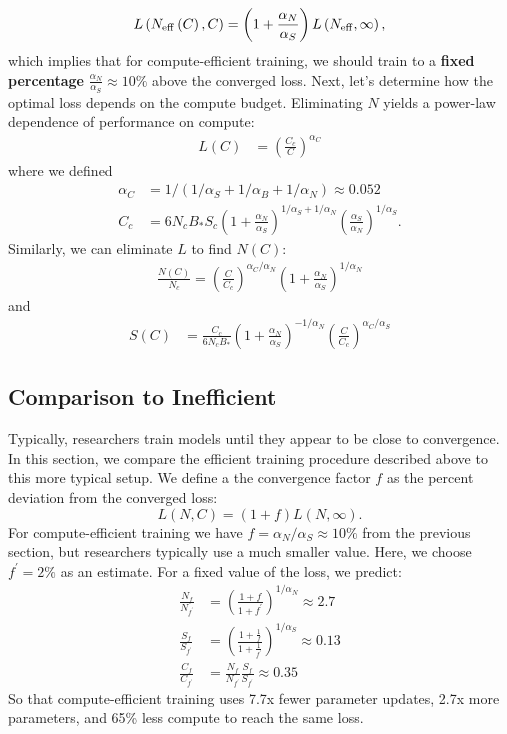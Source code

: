 \documentclass[english]{article}
\begin{document}
\begin{equation}
L\left(N_{{\rm eff}}\left(C\right),C\right)=\left(1+\frac{\alpha_{N}}{\alpha_{S}}\right)L\left(N_{{\rm eff}},\infty\right),
\end{equation}
which implies that for compute-efficient training, we should train to a \textbf{fixed percentage} $\frac{\alpha_{N}}{\alpha_{S}}\approx10\%$ above the converged loss.
Next, let's determine how the optimal loss depends on the compute budget. Eliminating $N$ yields a power-law dependence of performance on compute:
\begin{align}
L\left(C\right) & =\left(\frac{C_{c}}{C}\right)^{\alpha_{C}}
\end{align}
where we defined
\begin{align}
\alpha_{C} & =1/\left(1/\alpha_{S}+1/\alpha_{B}+1/\alpha_{N}\right)\approx0.052\\
C_{c} & =6N_{c}B_{\ast}S_{c}\left(1+\frac{\alpha_{N}}{\alpha_{S}}\right)^{1/\alpha_{S}+1/\alpha_{N}}\left(\frac{\alpha_{S}}{\alpha_{N}}\right)^{1/\alpha_{S}}.
\end{align}
Similarly, we can eliminate $L$ to find $N\left(C\right)$:
\begin{align}
\frac{N\left(C\right)}{N_{c}}=\left(\frac{C}{C_{c}}\right)^{\alpha_{C}/\alpha_{N}}\left(1+\frac{\alpha_{N}}{\alpha_{S}}\right)^{1/\alpha_{N}}
\end{align}
and
\begin{align}
S\left(C\right) & =\frac{C_{c}}{6N_{c}B_{\ast}}\left(1+\frac{\alpha_{N}}{\alpha_{S}}\right)^{-1/\alpha_{N}}\left(\frac{C}{C_{c}}\right)^{\alpha_{C}/\alpha_{S}}
\end{align}

\subsection{Comparison to Inefficient}
Typically, researchers train models until they appear to be close to convergence. In this section, we compare the efficient training procedure described above to this more typical setup.
We define a the convergence factor $f$ as the percent deviation from the converged loss:
\begin{equation}
L\left(N,C\right)=\left(1+f\right)L\left(N,\infty\right).
\end{equation}
For compute-efficient training we have $f=\alpha_{N}/\alpha_{S}\approx10\%$ from the previous section, but researchers typically use a much smaller value. Here, we choose $f^{\prime}=2\%$ as an estimate.
For a fixed value of the loss, we predict:
\begin{align}
\frac{N_{f}}{N_{f^{\prime}}} & =\left(\frac{1+f}{1+f^{\prime}}\right)^{1/\alpha_{N}}\approx2.7\\
\frac{S_{f}}{S_{f^{\prime}}} & =\left(\frac{1+\frac{1}{f}}{1+\frac{1}{f^{\prime}}}\right)^{1/\alpha_{S}}\approx0.13\\
\frac{C_{f}}{C_{f^{\prime}}} & =\frac{N_{f}}{N_{f^{\prime}}}\frac{S_{f}}{S_{f^{\prime}}}\approx0.35
\end{align}
So that compute-efficient training uses 7.7x fewer parameter updates, 2.7x more parameters, and 65\% less compute to reach the same loss.
\end{document}
